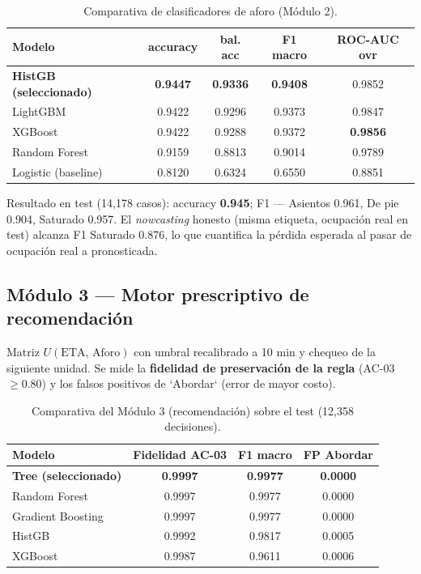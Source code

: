 \documentclass[11pt]{article}
\begin{document}
\begin{table}[H]
\centering
\caption{Comparativa de clasificadores de aforo (Módulo 2).}
\label{tab:aforo}
\begin{tabularx}{\textwidth}{lcccc}
\toprule
\textbf{Modelo} & \textbf{accuracy} & \textbf{bal. acc} & \textbf{F1 macro} & \textbf{ROC-AUC ovr} \\
\midrule
\textbf{HistGB (seleccionado)} & \textbf{0.9447} & \textbf{0.9336} & \textbf{0.9408} & 0.9852 \\
LightGBM & 0.9422 & 0.9296 & 0.9373 & 0.9847 \\
XGBoost & 0.9422 & 0.9288 & 0.9372 & \textbf{0.9856} \\
Random Forest & 0.9159 & 0.8813 & 0.9014 & 0.9789 \\
Logistic (baseline) & 0.8120 & 0.6324 & 0.6550 & 0.8851 \\
\bottomrule
\end{tabularx}
\end{table}

Resultado en test (14,178 casos): accuracy \textbf{0.945}; F1 --- Asientos 0.961, De pie 0.904,
Saturado 0.957. El \emph{nowcasting} honesto (misma etiqueta, ocupación real en test) alcanza F1
Saturado 0.876, lo que cuantifica la pérdida esperada al pasar de ocupación real a pronosticada.

\subsection{Módulo 3 --- Motor prescriptivo de recomendación}
Matriz $U(\text{ETA},\,\text{Aforo})$ con umbral recalibrado a 10 min y chequeo de la siguiente
unidad. Se mide la \textbf{fidelidad de preservación de la regla} (AC-03 $\geq 0.80$) y los
falsos positivos de `Abordar` (error de mayor costo).

\begin{table}[H]
\centering
\caption{Comparativa del Módulo 3 (recomendación) sobre el test (12,358 decisiones).}
\label{tab:mod3}
\begin{tabularx}{\textwidth}{lccc}
\toprule
\textbf{Modelo} & \textbf{Fidelidad AC-03} & \textbf{F1 macro} & \textbf{FP Abordar} \\
\midrule
\textbf{Tree (seleccionado)} & \textbf{0.9997} & \textbf{0.9977} & \textbf{0.0000} \\
Random Forest & 0.9997 & 0.9977 & 0.0000 \\
Gradient Boosting & 0.9997 & 0.9977 & 0.0000 \\
HistGB & 0.9992 & 0.9817 & 0.0005 \\
XGBoost & 0.9987 & 0.9611 & 0.0006 \\
\bottomrule
\end{tabularx}
\end{table}
\end{document}
